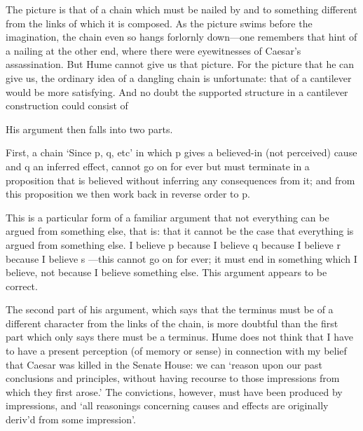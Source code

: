 The picture is that of a chain which must be nailed by and to something
different from the links of which it is composed. As the picture swims before
the imagination, the chain even so hangs forlornly down—one remembers that hint
of a nailing at the other end, where there were eyewitnesses of Caesar’s
assassination. But Hume cannot give us that picture. For the picture that he can
give us, the ordinary idea of a dangling chain is unfortunate: that of a
cantilever would be more satisfying. And no doubt the supported structure in a
cantilever construction could consist of


His argument then falls into two parts.

First, a chain ‘Since p, q, etc’ in which p gives a believed-in (not perceived)
cause and q an inferred effect, cannot go on for ever but must terminate in a
proposition that is believed without inferring any consequences from it; and
from this proposition we then work back in reverse order to p.

This is a particular form of a familiar argument that not everything can be
argued from something else, that is: that it cannot be the case that everything
is argued from something else. I believe p because I believe q because I believe
r because I believe s ---this cannot go on for ever; it must end in something
which I believe, not because I believe something else. This argument appears to
be correct.

The second part of his argument, which says that the terminus must be of a
different character from the links of the chain, is more doubtful than the first
part which only says there must be a terminus. Hume does not think that I have
to have a present perception (of memory or sense) in connection with my belief
that Caesar was killed in the Senate House: we can ‘reason upon our past
conclusions and principles, without having recourse to those impressions from
which they first arose.’ The convictions, however, must have been produced by
impressions, and ‘all reasonings concerning causes and effects are originally
deriv’d from some impression’.
